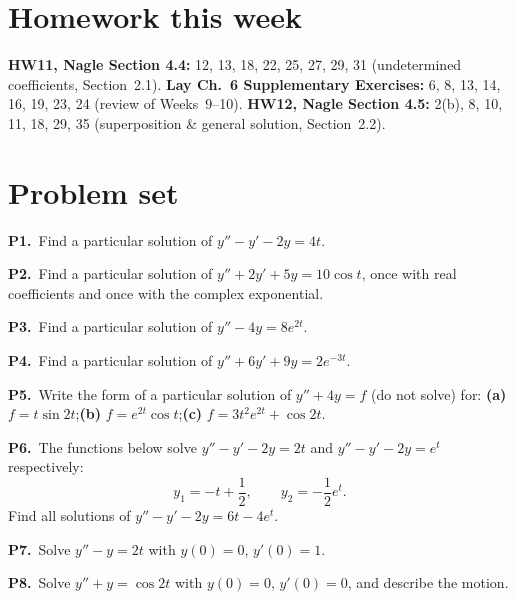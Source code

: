 \documentclass[10pt]{scrartcl}
\begin{document}
\section{Homework this week}
\begin{itemize}
  \ii \textbf{HW11, Nagle Section 4.4:} 12, 13, 18, 22, 25, 27, 29, 31 (undetermined coefficients, Section~2.1). \textbf{Lay Ch.~6 Supplementary Exercises:} 6, 8, 13, 14, 16, 19, 23, 24 (review of Weeks~9--10).
  \ii \textbf{HW12, Nagle Section 4.5:} 2(b), 8, 10, 11, 18, 29, 35 (superposition \& general solution, Section~2.2).
\end{itemize}

\section{Problem set}
\begin{prob}
  \textbf{P1.}\ Find a particular solution of $y''-y'-2y=4t$.
\end{prob}
\begin{prob}
  \textbf{P2.}\ Find a particular solution of $y''+2y'+5y=10\cos t$, once with real coefficients and once with the complex exponential.
\end{prob}
\begin{prob}
  \textbf{P3.}\ Find a particular solution of $y''-4y=8e^{2t}$.
\end{prob}
\begin{prob}
  \textbf{P4.}\ Find a particular solution of $y''+6y'+9y=2e^{-3t}$.
\end{prob}
\begin{prob}
  \textbf{P5.}\ Write the form of a particular solution of $y''+4y=f$ (do not solve) for:
  \textbf{(a)} $f=t\sin 2t$;\quad \textbf{(b)} $f=e^{2t}\cos t$;\quad \textbf{(c)} $f=3t^2e^{2t}+\cos 2t$.
\end{prob}
\begin{prob}
  \textbf{P6.}\ The functions below solve $y''-y'-2y=2t$ and $y''-y'-2y=e^t$ respectively:
  \[
    y_1 = -t+\frac12, \qquad y_2 = -\frac12 e^t.
  \]
  Find all solutions of $y''-y'-2y=6t-4e^t$.
\end{prob}
\begin{prob}
  \textbf{P7.}\ Solve $y''-y=2t$ with $y(0)=0$, $y'(0)=1$.
\end{prob}
\begin{prob}
  \textbf{P8.}\ Solve $y''+y=\cos 2t$ with $y(0)=0$, $y'(0)=0$, and describe the motion.
\end{prob}
\end{document}
